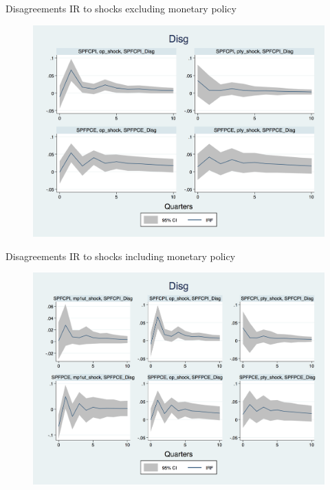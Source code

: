 \documentclass{beamer}
\begin{document}
\begin{frame}{Disagreements IR to  shocks excluding monetary policy}

\begin{figure}
	\includegraphics[scale=0.3]{figures/SPFDisg_ashocks_nmp.png} 
\end{figure}

\end{frame}


\begin{frame}{Disagreements IR to  shocks including monetary policy}

\begin{figure}
	\includegraphics[scale=0.3]{figures/SPFDisg_ashocks.png} 
\end{figure}

\end{frame}
\end{document}
